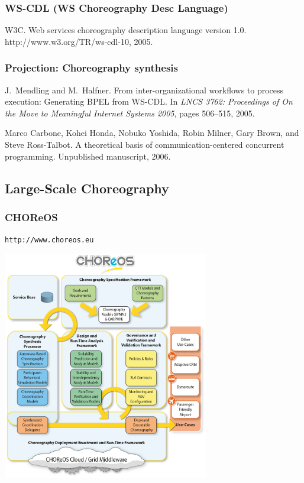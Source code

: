 \documentclass{myproc}
\begin{document}
\eit
\subsubsection{WS-CDL (WS Choreography Desc Language)}
\bit
\w \textcolor{blue2}{W3C. \newblock Web services choreography description
  language version 1.0. \newblock http://www.w3.org/TR/ws-cdl-10, 2005.}
\eit



\subsubsection{\textcolor{red2}{\bf{}Projection: Choreography synthesis}}
\bit
\w J.~Mendling and M.~Halfner.
\newblock From inter-organizational workflows to process execution: Generating
  {BPEL} from {WS-CDL}.
\newblock In {\em LNCS 3762: Proceedings of On the Move to Meaningful Internet
  Systems 2005}, pages 506--515, 2005.

\w \textcolor{blue2}{Marco Carbone, Kohei Honda, Nobuko Yoshida, Robin Milner, Gary Brown, and Steve
  Ross-Talbot.
\newblock A theoretical basis of communication-centered concurrent programming.
\newblock Unpublished manuscript, 2006.}

\eit

\subsection{Large-Scale Choreography}
\subsubsection{CHOReOS}
\bit
\w \texttt{http://www.choreos.eu}
\eit
\centerline{\includegraphics[width=9cm]{pics/choreos}}
\end{document}
